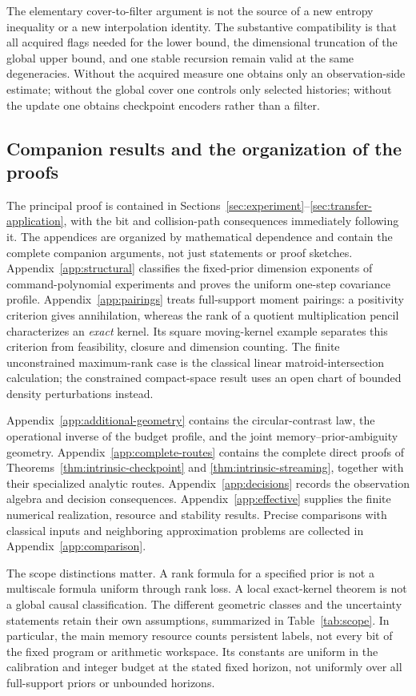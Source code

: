 The elementary cover-to-filter argument is not the source of a new
entropy inequality or a new interpolation identity. The substantive
compatibility is that all acquired flags needed for the lower bound,
the dimensional truncation of the global upper bound, and one stable
recursion remain valid at the same degeneracies. Without the acquired
measure one obtains only an observation-side estimate; without the
global cover one controls only selected histories; without the update
one obtains checkpoint encoders rather than a filter.

\subsection{Companion results and the organization of the proofs}
The principal proof is contained in Sections~\ref{sec:experiment}--\ref{sec:transfer-application},
with the bit and collision-path consequences immediately following it.
The appendices are organized by mathematical dependence and contain the
complete companion arguments, not just statements or proof sketches.
Appendix~\ref{app:structural} classifies the fixed-prior dimension
exponents of command-polynomial experiments and proves the uniform
one-step covariance profile. Appendix~\ref{app:pairings} treats
full-support moment pairings: a positivity criterion gives annihilation,
whereas the rank of a quotient multiplication pencil characterizes an
\emph{exact} kernel. Its square moving-kernel example separates this
criterion from feasibility, closure and dimension counting. The finite
unconstrained maximum-rank case is the classical linear
matroid-intersection calculation; the constrained compact-space result
uses an open chart of bounded density perturbations instead.

Appendix~\ref{app:additional-geometry} contains the circular-contrast
law, the operational inverse of the budget profile, and the joint
memory--prior-ambiguity geometry. Appendix~\ref{app:complete-routes}
contains the complete direct proofs of
Theorems~\ref{thm:intrinsic-checkpoint} and
\ref{thm:intrinsic-streaming}, together with their specialized analytic routes.
Appendix~\ref{app:decisions} records the observation algebra and decision
consequences. Appendix~\ref{app:effective} supplies the finite numerical
realization, resource and stability results. Precise comparisons with
classical inputs and neighboring approximation problems are collected
in Appendix~\ref{app:comparison}.

The scope distinctions matter. A rank formula for a specified prior
is not a multiscale formula uniform through rank loss. A local
exact-kernel theorem is not a global causal classification. The
different geometric classes and the uncertainty statements retain their
own assumptions, summarized in Table~\ref{tab:scope}. In particular,
the main memory resource counts persistent labels, not every bit of
the fixed program or arithmetic workspace. Its constants are uniform
in the calibration and integer budget at the stated fixed horizon,
not uniformly over all full-support priors or unbounded horizons.

